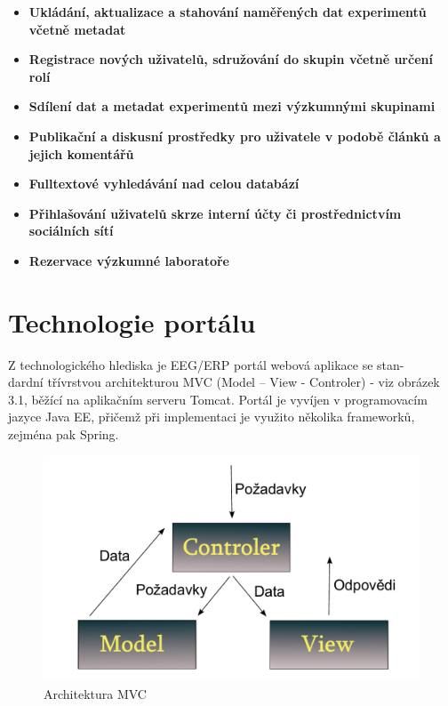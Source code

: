 \documentclass{projekt}
\begin{document}
\begin {itemize}

\item \textbf{Ukládání, aktualizace a stahování naměřených dat experimentů včetně metadat} 

\item \textbf{Registrace nových uživatelů, sdružování do skupin včetně určení rolí} 
\item \textbf{Sdílení dat a metadat experimentů mezi výzkumnými skupinami}
\item \textbf{Publikační a diskusní prostředky pro uživatele v podobě článků a jejich komentářů }
\item \textbf{Fulltextové vyhledávání nad celou databází}
\item \textbf{Přihlašování uživatelů skrze interní účty či prostřednictvím sociálních sítí}
\item \textbf{Rezervace výzkumné laboratoře}

\end {itemize}

\section{Technologie portálu}
\hspace{0.65cm}Z technologického hlediska je EEG/ERP portál webová aplikace se stan-\\dardní třívrstvou architekturou MVC (Model – View - Controler) - viz obrázek 3.1, běžící na aplikačním serveru Tomcat. Portál je vyvíjen v programovacím jazyce Java EE, přičemž při implementaci je využito několika frameworků, zejména pak Spring.

\begin{figure}[htb]
\begin{center}
\includegraphics[scale=0.6]{mvc.pdf}
\caption{Architektura MVC}
\end{center}
\end{figure}
\end{document}

